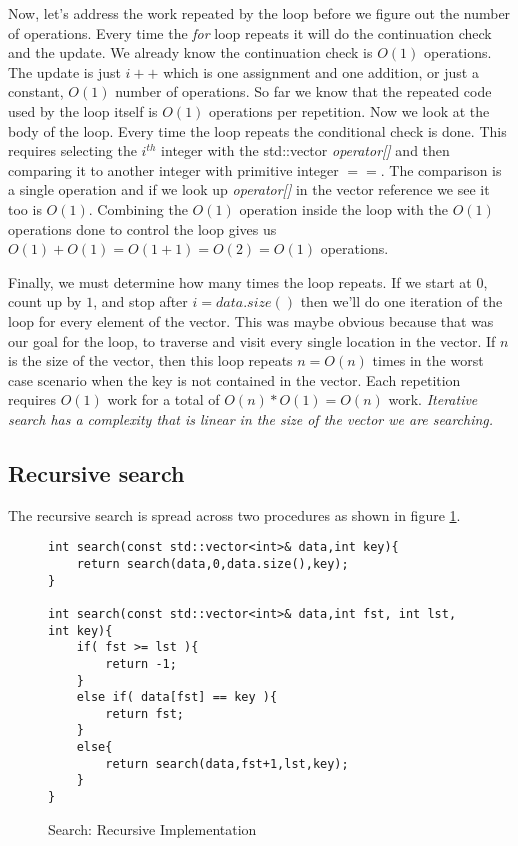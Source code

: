\documentclass[]{tufte-handout}
\begin{document}
Now, let's address the work repeated by the loop before we figure out the number of operations.  Every time the \textit{for} loop repeats it will do the continuation check and the update.  We already know the continuation check is $O(1)$ operations. The update is just $i++$ which is one assignment and one addition, or just a constant, $O(1)$ number of operations. So far we know that the repeated code used by the loop itself is $O(1)$ operations per repetition. Now we look at the body of the loop. Every time the loop repeats the conditional check is done. This requires selecting the $i^{th}$ integer with the std::vector \textit{operator[]} and then comparing it to another integer with primitive integer $==$.  The comparison is a single operation and if we look up \textit{operator[]} in the vector reference we see it too is $O(1)$. Combining the $O(1)$ operation inside the loop with the $O(1)$ operations done to control the loop gives us $O(1)+O(1)=O(1 + 1)=O(2)=O(1)$ operations. 

Finally, we must determine how many times the loop repeats. If we start at $0$, count up by $1$, and stop after $i = data.size()$ then we'll do one iteration of the loop for every element of the vector. This was maybe obvious because that was our goal for the loop, to traverse and visit every single location in the vector. If $n$ is the size of the vector, then this loop repeats $n = O(n)$ times in the worst case scenario when the key is not contained in the vector. Each repetition requires $O(1)$ work for a total of $O(n)*O(1) = O(n)$ work. \textit{Iterative search has a complexity that is linear in the size of the vector we are searching.}

\subsection{Recursive search}

The recursive search is spread across two procedures as shown in figure \ref{code:searchrec}. 

\begin{figure}[htpb!]
\begin{lstlisting}
int search(const std::vector<int>& data,int key){
	return search(data,0,data.size(),key);
}

int search(const std::vector<int>& data,int fst, int lst, int key){
	if( fst >= lst ){
		return -1;
	}
	else if( data[fst] == key ){
		return fst;
	}
	else{
		return search(data,fst+1,lst,key);
	}
}
\end{lstlisting}
\label{code:searchrec}
\caption{Search: Recursive Implementation} 
\end{figure}
\end{document}
